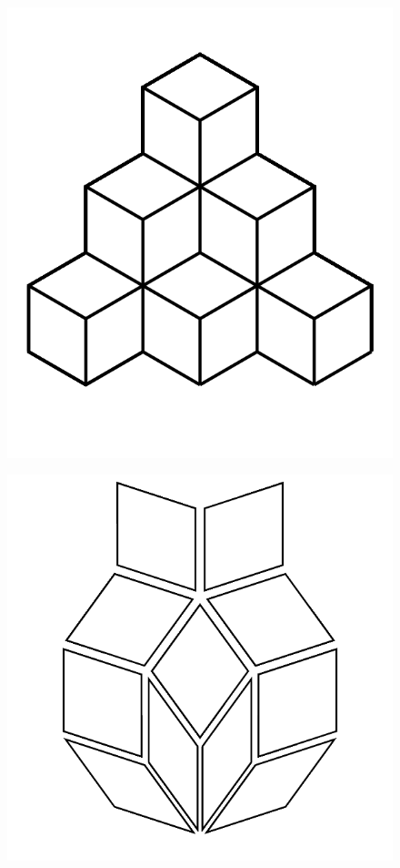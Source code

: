 \documentclass[17pt]{extreport}
\begin{document}
	\begin{figure}
		\centering
		\includegraphics[width=6.25in]{imageserver/uploadimages/qubert.png}
	\end{figure}


	\begin{figure}
		\centering
		\includegraphics[width=6.25in]{imageserver/uploadimages/pi.png}
	\end{figure}
	
\end{document}
